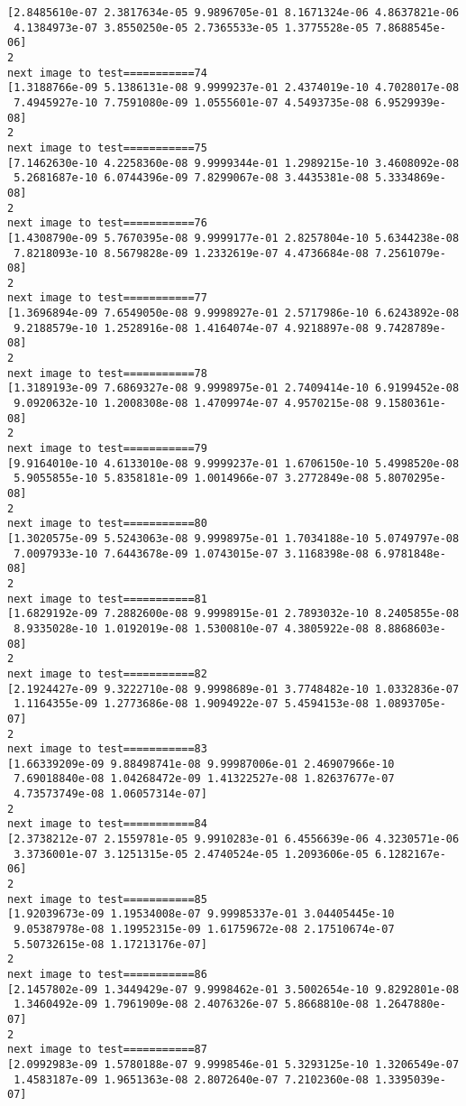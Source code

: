 \documentclass[11pt]{article}
\begin{document}
\begin{Verbatim}[commandchars=\\\{\}]
[2.8485610e-07 2.3817634e-05 9.9896705e-01 8.1671324e-06 4.8637821e-06
 4.1384973e-07 3.8550250e-05 2.7365533e-05 1.3775528e-05 7.8688545e-06]
2
next image to test===========74
[1.3188766e-09 5.1386131e-08 9.9999237e-01 2.4374019e-10 4.7028017e-08
 7.4945927e-10 7.7591080e-09 1.0555601e-07 4.5493735e-08 6.9529939e-08]
2
next image to test===========75
[7.1462630e-10 4.2258360e-08 9.9999344e-01 1.2989215e-10 3.4608092e-08
 5.2681687e-10 6.0744396e-09 7.8299067e-08 3.4435381e-08 5.3334869e-08]
2
next image to test===========76
[1.4308790e-09 5.7670395e-08 9.9999177e-01 2.8257804e-10 5.6344238e-08
 7.8218093e-10 8.5679828e-09 1.2332619e-07 4.4736684e-08 7.2561079e-08]
2
next image to test===========77
[1.3696894e-09 7.6549050e-08 9.9998927e-01 2.5717986e-10 6.6243892e-08
 9.2188579e-10 1.2528916e-08 1.4164074e-07 4.9218897e-08 9.7428789e-08]
2
next image to test===========78
[1.3189193e-09 7.6869327e-08 9.9998975e-01 2.7409414e-10 6.9199452e-08
 9.0920632e-10 1.2008308e-08 1.4709974e-07 4.9570215e-08 9.1580361e-08]
2
next image to test===========79
[9.9164010e-10 4.6133010e-08 9.9999237e-01 1.6706150e-10 5.4998520e-08
 5.9055855e-10 5.8358181e-09 1.0014966e-07 3.2772849e-08 5.8070295e-08]
2
next image to test===========80
[1.3020575e-09 5.5243063e-08 9.9998975e-01 1.7034188e-10 5.0749797e-08
 7.0097933e-10 7.6443678e-09 1.0743015e-07 3.1168398e-08 6.9781848e-08]
2
next image to test===========81
[1.6829192e-09 7.2882600e-08 9.9998915e-01 2.7893032e-10 8.2405855e-08
 8.9335028e-10 1.0192019e-08 1.5300810e-07 4.3805922e-08 8.8868603e-08]
2
next image to test===========82
[2.1924427e-09 9.3222710e-08 9.9998689e-01 3.7748482e-10 1.0332836e-07
 1.1164355e-09 1.2773686e-08 1.9094922e-07 5.4594153e-08 1.0893705e-07]
2
next image to test===========83
[1.66339209e-09 9.88498741e-08 9.99987006e-01 2.46907966e-10
 7.69018840e-08 1.04268472e-09 1.41322527e-08 1.82637677e-07
 4.73573749e-08 1.06057314e-07]
2
next image to test===========84
[2.3738212e-07 2.1559781e-05 9.9910283e-01 6.4556639e-06 4.3230571e-06
 3.3736001e-07 3.1251315e-05 2.4740524e-05 1.2093606e-05 6.1282167e-06]
2
next image to test===========85
[1.92039673e-09 1.19534008e-07 9.99985337e-01 3.04405445e-10
 9.05387978e-08 1.19952315e-09 1.61759672e-08 2.17510674e-07
 5.50732615e-08 1.17213176e-07]
2
next image to test===========86
[2.1457802e-09 1.3449429e-07 9.9998462e-01 3.5002654e-10 9.8292801e-08
 1.3460492e-09 1.7961909e-08 2.4076326e-07 5.8668810e-08 1.2647880e-07]
2
next image to test===========87
[2.0992983e-09 1.5780188e-07 9.9998546e-01 5.3293125e-10 1.3206549e-07
 1.4583187e-09 1.9651363e-08 2.8072640e-07 7.2102360e-08 1.3395039e-07]

\end{Verbatim}
\end{document}
